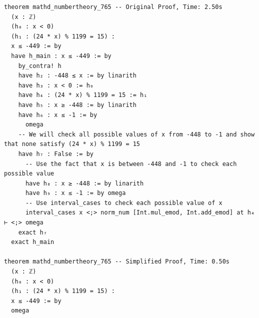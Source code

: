 \begin{tcolorbox}[colback=lightblue, boxrule=0pt, arc=5pt, outer arc=5pt, after skip=10pt plus 2pt]
\begin{lstlisting}[caption={Example of Speedup after Simplification (orig: 2.5s, new: 0.5s)},label={lst:minif2f-speedup-2}, captionpos=t, language=lean, breaklines=true, style=mystyle]
theorem mathd_numbertheory_765 -- Original Proof, Time: 2.50s
  (x : ℤ)
  (h₀ : x < 0)
  (h₁ : (24 * x) % 1199 = 15) :
  x ≤ -449 := by
  have h_main : x ≤ -449 := by
    by_contra! h
    have h₂ : -448 ≤ x := by linarith
    have h₃ : x < 0 := h₀
    have h₄ : (24 * x) % 1199 = 15 := h₁
    have h₅ : x ≥ -448 := by linarith
    have h₆ : x ≤ -1 := by
      omega
    -- We will check all possible values of x from -448 to -1 and show that none satisfy (24 * x) % 1199 = 15
    have h₇ : False := by
      -- Use the fact that x is between -448 and -1 to check each possible value
      have h₈ : x ≥ -448 := by linarith
      have h₉ : x ≤ -1 := by omega
      -- Use interval_cases to check each possible value of x
      interval_cases x <;> norm_num [Int.mul_emod, Int.add_emod] at h₄ ⊢ <;> omega
    exact h₇
  exact h_main

theorem mathd_numbertheory_765 -- Simplified Proof, Time: 0.50s
  (x : ℤ)
  (h₀ : x < 0)
  (h₁ : (24 * x) % 1199 = 15) :
  x ≤ -449 := by
  omega
\end{lstlisting}
\end{tcolorbox}

